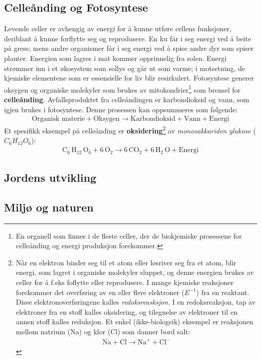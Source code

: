 \documentclass[main.tex]{subfiles}
\begin{document}
\subsection{Celleånding og Fotosyntese}
Levende celler er avhengig av energi for å kunne utføre cellens funksjoner, deriblant å kunne forflytte seg og reprodusere. En ku får i seg energi ved å beite på gress; mens andre organismer får i seg energi ved å spise andre dyr som spiser planter. Energien som lagres i mat kommer opprinnelig fra solen. Energi strømmer inn i et økosystem som sollys og går ut som varme; i motsetning, de kjemiske elementene som er essensielle for liv blir resirkulert. Fotosyntese generer oksygen og organiske molekyler som brukes av mitokondrier\footnote{En organell som finnes i de fleste celler, der de biokjemiske prosessene for celleånding og energi produksjon forekommer.} som brensel for \textbf{celleånding}. Avfallsproduktet fra celleåndingen er karbondioksid og vann, som igjen brukes i fotosyntese. Denne prosessen kan oppsummeres som følgende:
\begin{align*}
\text{Organisk materie} + \text{Oksygen} \longrightarrow \text{Karbondioksid} + \text{Vann} + \text{Energi}
\end{align*}
Et spesifikk eksempel på celleånding er \textbf{oksidering}\footnote{Når en elektron binder seg til et atom eller løsriver seg fra et atom, blir energi, som lagret i organiske molekyler sluppet, og denne energien brukes av celler for å f.eks foflytte eller reprodusere. I mange kjemiske reaksjoner forekommer det overføring av en eller flere elektroner ($E^{-1}$) fra en reaktant. Disse elektronoverføringene kalles \emph{redoksreasksjon}. I en redoksreaksjon, tap av elektroner fra en stoff kalles oksidering, og tilegnelse av elektroner til en annen stoff kalles reduksjon. Et enkel (ikke-biologsik) eksempel er reaksjonen mellom natrium (Na) og klor (Cl) som danner bord salt: 
\begin{align*} 
\text{Na} + \text{Cl} \longrightarrow \text{Na}^+ + \text{Cl}^-
\end{align*}
} av \emph{monosakkariden glukose} ($C_6 H_{12} O_6$):
\begin{align*}
\text{C}_6\, \text{H}_{12}\, \text{O}_6 + 6\, \text{O}_2 \longrightarrow 6\, \text{CO}_2 + 6\, \text{H}_2\, \text{O} + \text{Energi}
\end{align*}

\subsection{Jordens utvikling}

\subsection{Miljø og naturen}
\end{document}
